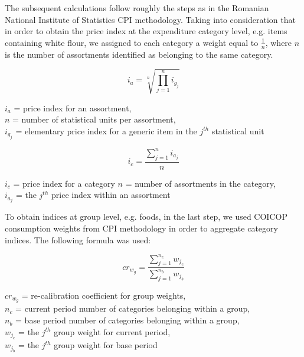 \documentclass[]{article}
\begin{document}
The subsequent calculations follow roughly the steps as in the Romanian National Institute of Statistics CPI methodology\cite{cpi}. Taking into consideration that in order to obtain the price index at the expenditure category level, e.g. items containing white flour, we assigned to each category a weight equal to $\frac{1}{n}$,
where $n$ is the number of assortments identified as belonging to the same category. 

\begin{equation}\label{eq:4}
i_{a} = \sqrt[n]{\prod_{j=1}^n i_{g_{j}}}
\end{equation}

\begin{center}
	$i_{a}$ = price index for an assortment, \\
	$n$ = number of statistical units per assortment, \\
	$i_{g_{j}}$ = elementary price index for a generic item in the $j^{th}$ statistical unit
\end{center}


\begin{equation}\label{eq:5}
i_{c} = \frac{\sum_{j=1}^n i_{a_{j}}}{n}
\end{equation}

\begin{center}
	$i_{c}$ = price index for a category
	$n$ = number of assortments in the category, \\
	$i_{a_{j}}$ = the $j^{th}$ price index within an assortment
\end{center}

To obtain indices at group level, e.g. foods, in the last step, we used COICOP consumption weights from CPI methodology in order to aggregate category indices.  The following formula was used:


\begin{equation}\label{eq:6}
cr_{w_{g}} = \frac{\sum_{j=1}^{n_{c}}{w_{j_{c}}}}{\sum_{j=1}^{n_{b}}{w_{j_{b}}}}
\end{equation}

\begin{center}
	$cr_{w_{g}}$ = re-calibration coefficient for group weights, \\
	$n_{c}$ = current period number of categories belonging within a group, \\
	$n_{b}$ = base period number of categories belonging within a group, \\
	$w_{j_{c}}$ = the $j^{th}$ group weight for current period, \\
	$w_{j_{b}}$ = the $j^{th}$ group weight for base period
	
\end{center}
\end{document}

